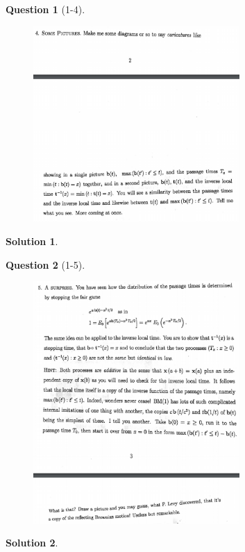 \documentclass[11pt]{article}
\theoremstyle{plain}
\theoremstyle{quest}
\newtheorem*{question}{Question}
\newtheorem*{solution}{Solution}
\begin{document}
\begin{question}[1-4]
\hfill
\begin{figure}[h!]
  \centering
    \includegraphics[width=0.7\textwidth]{limthm2-f-p4.png}
\end{figure}
\end{question}
\begin{solution} \hfill \\
\end{solution}

\newpage

\begin{question}[1-5]
\hfill
\begin{figure}[h!]
  \centering
    \includegraphics[width=0.7\textwidth]{limthm2-f-p5.png}
\end{figure}
\end{question}
\begin{solution} \hfill \\
\end{solution}
\end{document}
